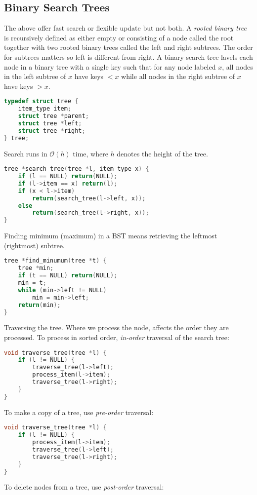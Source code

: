 \documentclass[10pt]{article}
\theoremstyle{definition}
\begin{document}
\subsection{Binary Search Trees}
The above offer fast search or flexible update but not both. A \textit{rooted binary tree} is recursively defined as either empty or consisting of a node called the root together with two rooted binary trees called the left and right subtrees. The order for subtrees matters so left is different from right. A binary search tree lavels each node in a binary tree with a single key such that for any node labeled $x$, all nodes in the left subtree of $x$ have keys $<x$  while all nodes in the right subtree of $x$ have keys $>x$.
\begin{lstlisting}[language=C]
typedef struct tree {
    item_type item;
    struct tree *parent;
    struct tree *left;
    struct tree *right;
} tree;
\end{lstlisting}
Search runs in $\mathcal{O}(h)$ time, where $h$ denotes the height of the tree.
\begin{lstlisting}[language=C]
tree *search_tree(tree *l, item_type x) {
    if (l == NULL) return(NULL);
    if (l->item == x) return(l);
    if (x < l->item)
        return(search_tree(l->left, x));
    else
        return(search_tree(l->right, x));
}
\end{lstlisting}
Finding minimum (maximum) in a BST means retrieving the leftmost (rightmost) subtree.
\begin{lstlisting}[language=C]
tree *find_minumum(tree *t) {
    tree *min;
    if (t == NULL) return(NULL);
    min = t;
    while (min->left != NULL)
        min = min->left;
    return(min);
}
\end{lstlisting}
Traversing the tree. Where we process the node, affects the order they are processed. To process in sorted order, \textit{in-order} traversal of the search tree:
\begin{lstlisting}[language=C]
void traverse_tree(tree *l) {
    if (l != NULL) {
        traverse_tree(l->left);
        process_item(l->item);
        traverse_tree(l->right);
    }
}
\end{lstlisting}
To make a copy of a tree, use \textit{pre-order} traversal:
\begin{lstlisting}[language=C]
void traverse_tree(tree *l) {
    if (l != NULL) {
        process_item(l->item);
        traverse_tree(l->left);
        traverse_tree(l->right);
    }
}
\end{lstlisting}
To delete nodes from a tree, use \textit{post-order} traversal:
\end{document}

